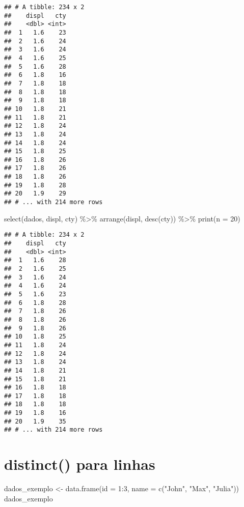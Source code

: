 \documentclass[
]{book}
\newenvironment{Shaded}{\begin{snugshade}}{\end{snugshade}}
\newcommand{\AttributeTok}[1]{\textcolor[rgb]{0.77,0.63,0.00}{#1}}
\newcommand{\DecValTok}[1]{\textcolor[rgb]{0.00,0.00,0.81}{#1}}
\newcommand{\FunctionTok}[1]{\textcolor[rgb]{0.00,0.00,0.00}{#1}}
\newcommand{\NormalTok}[1]{#1}
\newcommand{\OtherTok}[1]{\textcolor[rgb]{0.56,0.35,0.01}{#1}}
\newcommand{\SpecialCharTok}[1]{\textcolor[rgb]{0.00,0.00,0.00}{#1}}
\newcommand{\StringTok}[1]{\textcolor[rgb]{0.31,0.60,0.02}{#1}}
\begin{document}
\begin{verbatim}
## # A tibble: 234 x 2
##    displ   cty
##    <dbl> <int>
##  1   1.6    23
##  2   1.6    24
##  3   1.6    24
##  4   1.6    25
##  5   1.6    28
##  6   1.8    16
##  7   1.8    18
##  8   1.8    18
##  9   1.8    18
## 10   1.8    21
## 11   1.8    21
## 12   1.8    24
## 13   1.8    24
## 14   1.8    24
## 15   1.8    25
## 16   1.8    26
## 17   1.8    26
## 18   1.8    26
## 19   1.8    28
## 20   1.9    29
## # ... with 214 more rows
\end{verbatim}

\begin{Shaded}
\begin{Highlighting}[]
\FunctionTok{select}\NormalTok{(dados, displ, cty) }\SpecialCharTok{\%\textgreater{}\%} 
  \FunctionTok{arrange}\NormalTok{(displ, }\FunctionTok{desc}\NormalTok{(cty)) }\SpecialCharTok{\%\textgreater{}\%} 
  \FunctionTok{print}\NormalTok{(}\AttributeTok{n =} \DecValTok{20}\NormalTok{)}
\end{Highlighting}
\end{Shaded}

\begin{verbatim}
## # A tibble: 234 x 2
##    displ   cty
##    <dbl> <int>
##  1   1.6    28
##  2   1.6    25
##  3   1.6    24
##  4   1.6    24
##  5   1.6    23
##  6   1.8    28
##  7   1.8    26
##  8   1.8    26
##  9   1.8    26
## 10   1.8    25
## 11   1.8    24
## 12   1.8    24
## 13   1.8    24
## 14   1.8    21
## 15   1.8    21
## 16   1.8    18
## 17   1.8    18
## 18   1.8    18
## 19   1.8    16
## 20   1.9    35
## # ... with 214 more rows
\end{verbatim}

\hypertarget{distinct-para-linhas}{%
\section{distinct() para linhas}\label{distinct-para-linhas}}

\begin{Shaded}
\begin{Highlighting}[]
\NormalTok{dados\_exemplo }\OtherTok{\textless{}{-}} \FunctionTok{data.frame}\NormalTok{(}\AttributeTok{id =} \DecValTok{1}\SpecialCharTok{:}\DecValTok{3}\NormalTok{,}
                         \AttributeTok{name =} \FunctionTok{c}\NormalTok{(}\StringTok{"John"}\NormalTok{, }\StringTok{"Max"}\NormalTok{, }\StringTok{"Julia"}\NormalTok{))}
\NormalTok{dados\_exemplo}
\end{Highlighting}
\end{Shaded}
\end{document}
